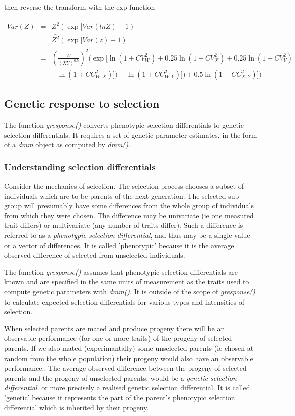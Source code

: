 \documentclass[titlepage]{article}  %
\begin{document}
then reverse the transform with the exp function

\begin{eqnarray*}
Var(Z) & = & \bar{Z^{2}}(\exp[Var(lnZ) - 1) \\
       & = & \bar{Z^{2}}(\exp[Var(z) - 1) \\
       & = & \bar{(\frac{W}{(XY)^{0.5}})^{2}}(\exp[\ln(1+CV^{2}_{W}) + 0.25 \ln(1 + CV^{2}_{X}) + 0.25 \ln(1 + CV^{2}_{Y}) \\
       &   &  - \ln(1 + CC^{2}_{W,X})]) - \ln(1 + CC^{2}_{W,Y})]) + 0.5 \ln(1 + CC^{2}_{X,Y})])
\end{eqnarray*}




\clearpage
\subsection{Genetic response to selection}

The function {\em gresponse()} converts phenotypic selection differentials to genetic selection differentials. It requires a set of genetic parameter estimates, in the form of a {\em dmm} object as computed by {\em dmm()}.

\subsubsection{Understanding selection differentials}
 Consider the mechanics of selection. The selection process chooses a subset of individuals which are to be parents of the next generation. The selected sub-group will presumably have some differences from the whole group of individuals from which they were chosen. The difference may be univariate (ie one measured trait differs) or multivariate (any number of traits differ). Such a difference is referred to as a {\em phenotypic selection differential}, and thus may be a single value or a vector of differences. It is called 'phenotypic' because it is the average observed difference of selected from unselected individuals.

The function {\em gresponse()} assumes that phenotypic selection differentials are known and are specified in the same units of measurement as the traits used to compute genetic parameters with {\em dmm()}. It is outside of the scope of {\em gresponse()} to calculate expected selection differentials for various types and intensities of selection.

When selected parents are mated and produce progeny there will be an observable performance (for one or more traits) of the progeny of selected parents. If we also mated (experimantally) some unselected parents (ie chosen at random from the whole population) their progeny would also have an observable performance.. The average observed difference between the progeny of selected parents and the progeny of unselected parents, would be a {\em genetic selection differential}. or more precisely a realised genetic selection differential. It is called 'genetic' because it represents the part of the parent's phenotypic selection differential which is inherited by their progeny.
\end{document}
